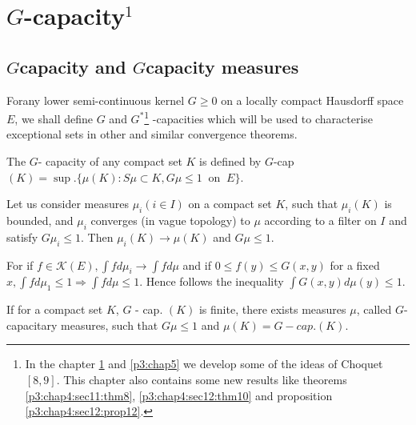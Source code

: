 \chapter{\texorpdfstring{$G$}{G}-capacity\texorpdfstring{${}^1$}{1}}\label{p3:chap4}


\setcounter{section}{8}
\section{\texorpdfstring{$G$}-capacity and \texorpdfstring{$G$}-capacity measures}\label{p3:chap4:sec9}%

For\pageoriginale any lower semi-continuous kernel $G \geq 0$ on a
locally compact 
Hausdorff space $E$, we shall define $G$ and $G^*$\footnote{In the
  chapter \ref{p3:chap4} and \ref{p3:chap5} we develop some of the
  ideas of Choquet $[8,9]$. This chapter also contains some new
  results like theorems \ref{p3:chap4:sec11:thm8},
  \ref{p3:chap4:sec12:thm10} and proposition   
 \ref{p3:chap4:sec12:prop12}.} -capacities which will be used to
characterise exceptional sets 
in other and similar convergence theorems.  

\begin{defn}\label{p3:chap4:sec9:def12}%
  The $G$- capacity of any compact set $K$ is defined by $G$-cap $(K) =
  \sup.  \{\mu (K):S \mu \subset K, G \mu \leq 1~\text{ on }~E\}$. 
\end{defn}

\setcounter{Lemma}{3}
\begin{Lemma}\label{p3:chap4:sec9:lem4}%
  Let us consider measures $\mu_i (i \in I)$ on a compact set $K$,
  such that $\mu_i (K)$ is bounded, and $\mu_i$ converges (in vague
  topology) to $\mu $ according to a filter on $I$ and satisfy $G
  \mu_i \leq 1$. Then $\mu _ i (K) \to \mu (K)$  and $G \mu \leq 1$.  
\end{Lemma} 

For if $f \in \mathscr{K}(E), \int f d \mu _i \to \int f d \mu $ and
if $0 \leq f (y) \leq G(x, y )$ for a fixed $x, \int f d \mu _1 \leq 1
\Rightarrow \int f d \mu \leq 1$. Hence follows the inequality $\int
G(x, y) d \mu (y) \leq 1$. 

\begin{prop}\label{p3:chap4:sec9:prop7}%
  If for a compact set $K$, $G$ - cap.  $(K)$ is finite, there exists
  measures $\mu$, called $G$-capacitary measures, such that $G \mu \leq
  1$ and $\mu (K)  = G- cap.  (K)$.  
\end{prop}

